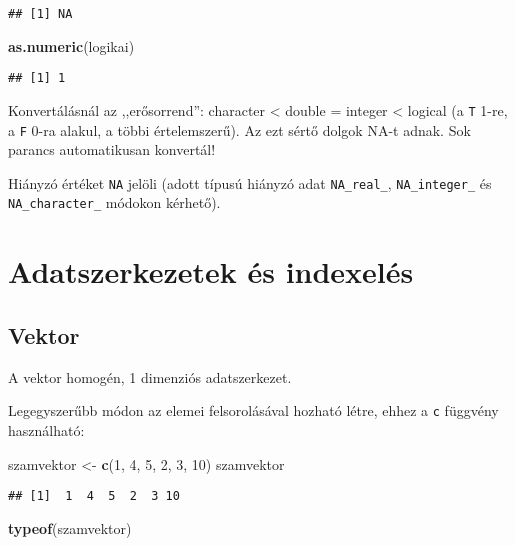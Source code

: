 \documentclass[]{book}
\newenvironment{Shaded}{\begin{snugshade}}{\end{snugshade}}
\newcommand{\KeywordTok}[1]{\textcolor[rgb]{0.13,0.29,0.53}{\textbf{#1}}}
\newcommand{\DecValTok}[1]{\textcolor[rgb]{0.00,0.00,0.81}{#1}}
\newcommand{\StringTok}[1]{\textcolor[rgb]{0.31,0.60,0.02}{#1}}
\newcommand{\NormalTok}[1]{#1}
\begin{document}
\begin{verbatim}
## [1] NA
\end{verbatim}

\begin{Shaded}
\begin{Highlighting}[]
\KeywordTok{as.numeric}\NormalTok{(logikai)}
\end{Highlighting}
\end{Shaded}

\begin{verbatim}
## [1] 1
\end{verbatim}

Konvertálásnál az ,,erősorrend'': character \textless{} double = integer
\textless{} logical (a \texttt{T} 1-re, a \texttt{F} 0-ra alakul, a
többi értelemszerű). Az ezt sértő dolgok NA-t adnak. Sok parancs
automatikusan konvertál!

Hiányzó értéket \texttt{NA} jelöli (adott típusú hiányzó adat
\texttt{NA\_real\_}, \texttt{NA\_integer\_} és \texttt{NA\_character\_}
módokon kérhető).

\section{Adatszerkezetek és
indexelés}\label{adatszerkezetek-es-indexeles}

\subsection{Vektor}\label{vektor}

A vektor homogén, 1 dimenziós adatszerkezet.

Legegyszerűbb módon az elemei felsorolásával hozható létre, ehhez a
\texttt{c} függvény használható:

\begin{Shaded}
\begin{Highlighting}[]
\NormalTok{szamvektor <-}\StringTok{ }\KeywordTok{c}\NormalTok{(}\DecValTok{1}\NormalTok{, }\DecValTok{4}\NormalTok{, }\DecValTok{5}\NormalTok{, }\DecValTok{2}\NormalTok{, }\DecValTok{3}\NormalTok{, }\DecValTok{10}\NormalTok{)}
\NormalTok{szamvektor}
\end{Highlighting}
\end{Shaded}

\begin{verbatim}
## [1]  1  4  5  2  3 10
\end{verbatim}

\begin{Shaded}
\begin{Highlighting}[]
\KeywordTok{typeof}\NormalTok{(szamvektor)}
\end{Highlighting}
\end{Shaded}
\end{document}
